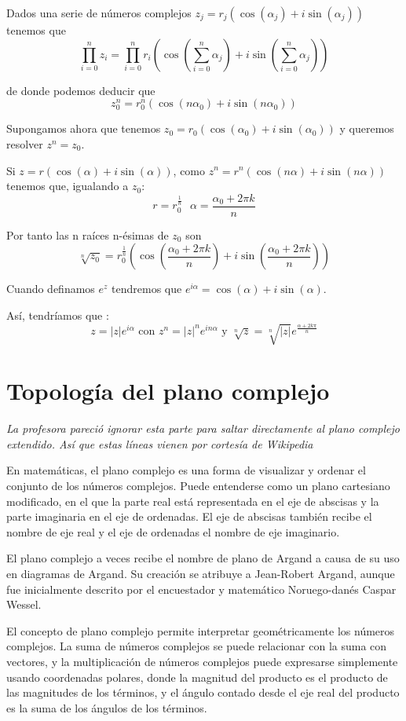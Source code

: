 \documentclass{apuntes}
\begin{document}
\begin{example}
Dados una serie de números complejos $z_j=r_j(\cos(α_j)+i\sin(α_j))$ tenemos que
\[\prod_{i=0}^n z_i = \prod_{i=0}^nr_i\left(\cos\left(\sum_{i=0}^n α_j\right)+i\sin\left(\sum_{i=0}^n α_j\right)\right)\]

de donde podemos deducir que
\[z_0^n = r_0^n\left(\cos(nα_0)+i\sin(nα_0)\right)\]
\end{example}

Supongamos ahora que tenemos $z_0=r_0(\cos(α_0)+i\sin(α_0))$ y queremos resolver $z^n=z_0$.

Si $z=r(\cos(α)+i\sin(α))$, como $z^n=r^n(\cos(nα)+i\sin(nα))$ tenemos que, igualando a $z_0$:
\[r=r_0^{\frac{1}{n}} \ \ \ α=\frac{α_0+2πk}{n}\]

Por tanto las n raíces n-ésimas de $z_0$ son
\[\sqrt[n]{z_0}=r_0^{\frac{1}{n}}\left(\cos\left(\frac{α_0+2πk}{n}\right)+i\sin\left(\frac{α_0+2πk}{n}\right)\right)\]

Cuando definamos $e^z$ tendremos que $e^{iα}=\cos(α)+i\sin(α)$.

Así, tendríamos que :
\[z=|z|e^{iα} \text{ con } z^n=|z|^ne^{inα} \text{ y } \sqrt[n]{z}=\sqrt[n]{|z|}e^{\frac{α+2kπ}{n}}\]
\section{Topología del plano complejo}
\textit{La profesora pareció ignorar esta parte para saltar directamente al plano complejo extendido. Así que estas líneas vienen por cortesía de Wikipedia}

En matemáticas, el plano complejo es una forma de visualizar y ordenar el conjunto de los números complejos. Puede entenderse como un plano cartesiano modificado, en el que la parte real está representada en el eje de abscisas y la parte imaginaria en el eje de ordenadas. El eje de abscisas también recibe el nombre de eje real y el eje de ordenadas el nombre de eje imaginario.

El plano complejo a veces recibe el nombre de plano de Argand a causa de su uso en diagramas de Argand. Su creación se atribuye a Jean-Robert Argand, aunque fue inicialmente descrito por el encuestador y matemático Noruego-danés Caspar Wessel.

El concepto de plano complejo permite interpretar geométricamente los números complejos. La suma de números complejos se puede relacionar con la suma con vectores, y la multiplicación de números complejos puede expresarse simplemente usando coordenadas polares, donde la magnitud del producto es el producto de las magnitudes de los términos, y el ángulo contado desde el eje real del producto es la suma de los ángulos de los términos.
\end{document}
